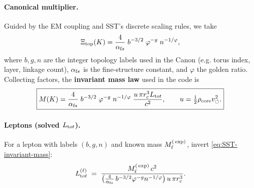 \documentclass[reprint,aps,onecolumn,nofootinbib]{revtex4-2}
\begin{document}
    \paragraph{Canonical multiplier.}
        Guided by the EM coupling and SST’s discrete scaling rules, we take
        \[
            \Xi_{\text{top}}(K)=\frac{4}{\alpha_{\textrm fs}}\;b^{-3/2}\;\varphi^{-g}\;n^{-1/\varphi},
        \]
        where $b,g,n$ are the integer topology labels used in the Canon (e.g. torus index, layer, linkage count), $\alpha_{\textrm fs}$ is the fine-structure constant, and $\varphi$ the golden ratio. Collecting factors, the \textbf{invariant mass law} used in the code is
        \begin{equation*}
        \boxed{M(K)=\frac{4}{\alpha_{\textrm fs}}\;b^{-3/2}\;\varphi^{-g}\;n^{-1/\varphi}\;
        \frac{u\,\pi r_c^3 L_{\textrm tot}}{c^2},
            \qquad
            u=\tfrac{1}{2}\rho_{\text{core}}v_{\circlearrowleft}^2.
        }\label{eq:SST-invariant-mass}
        \end{equation*}

    \paragraph{Leptons (solved $L_{\textrm tot}$).}
        For a lepton with labels $(b,g,n)$ and known mass $M_\ell^{\textrm(\exp)}$, invert \eqref{eq:SST-invariant-mass}:
        \[
            L_{\textrm tot}^{(\ell)} \;=\;
            \frac{M_\ell^{\textrm(\exp)}\,c^2}{\big(\tfrac{4}{\alpha_{\textrm fs}}\,b^{-3/2}\varphi^{-g}n^{-1/\varphi}\big)\,u\,\pi r_c^3}.
        \]
\end{document}
